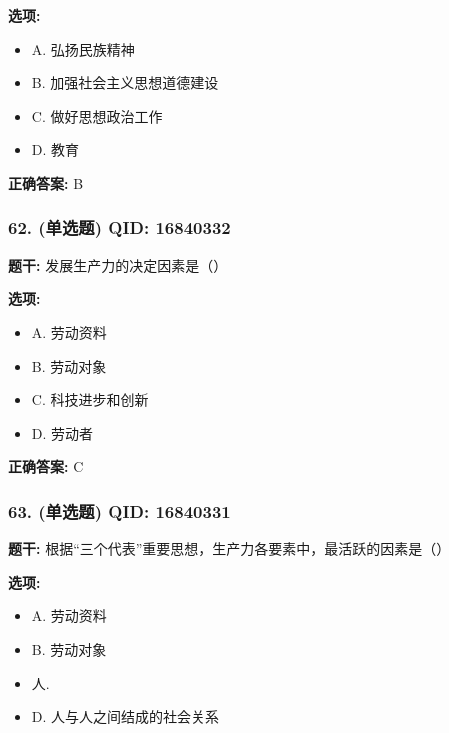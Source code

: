 \documentclass[12pt,UTF8]{ctexart}
\begin{document}
\textbf{选项:}
\begin{itemize}[leftmargin=*]

  \item A. 弘扬民族精神

  \item B. 加强社会主义思想道德建设

  \item C. 做好思想政治工作

  \item D. 教育

\end{itemize}

\textbf{正确答案:}
B

\vspace{0.3em}\hrulefill\vspace{0.7em}

\subsubsection*{62. (单选题) \small QID: 16840332}

\textbf{题干:}
发展生产力的决定因素是（）

\textbf{选项:}
\begin{itemize}[leftmargin=*]

  \item A. 劳动资料

  \item B. 劳动对象

  \item C. 科技进步和创新

  \item D. 劳动者

\end{itemize}

\textbf{正确答案:}
C

\vspace{0.3em}\hrulefill\vspace{0.7em}

\subsubsection*{63. (单选题) \small QID: 16840331}

\textbf{题干:}
根据“三个代表”重要思想，生产力各要素中，最活跃的因素是（）

\textbf{选项:}
\begin{itemize}[leftmargin=*]

  \item A. 劳动资料

  \item B. 劳动对象

  \item 人. 

  \item D. 人与人之间结成的社会关系

\end{itemize}
\end{document}
